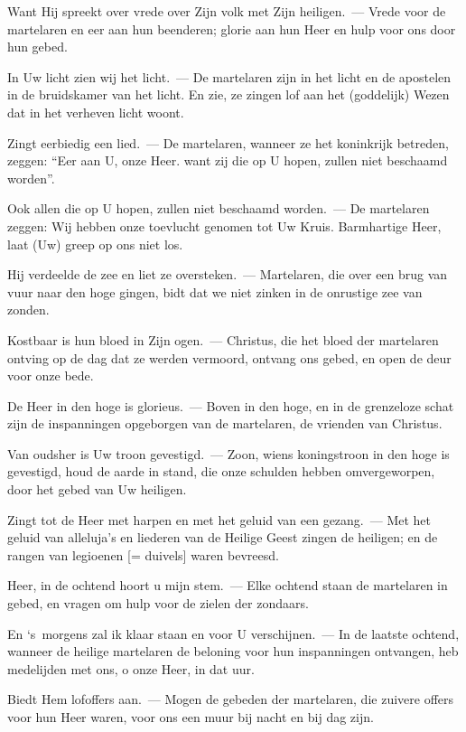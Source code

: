 \documentclass[12pt,twoside,a5paper]{article}
\begin{document}
\begin{halfparskip}
   Want Hij spreekt over vrede over Zijn volk met Zijn heiligen.~--- Vrede voor de martelaren en eer aan hun beenderen; glorie aan hun Heer en hulp voor ons door hun gebed.

  In Uw licht zien wij het licht.~--- De martelaren zijn in het licht en de apostelen in de bruidskamer van het licht. En zie, ze zingen lof aan het (goddelijk) Wezen dat in het verheven licht woont.

  Zingt eerbiedig een lied.~--- De martelaren, wanneer ze het koninkrijk betreden, zeggen: ``Eer aan U, onze Heer. want zij die op U hopen, zullen niet beschaamd worden''.

  Ook allen die op U hopen, zullen niet beschaamd worden.~--- De martelaren zeggen: Wij hebben onze toevlucht genomen tot Uw Kruis. Barmhartige Heer, laat (Uw) greep op ons niet los.

  Hij verdeelde de zee en liet ze oversteken.~--- Martelaren, die over een brug van vuur naar den hoge gingen, bidt dat we niet zinken in de onrustige zee van zonden.

  Kostbaar is hun bloed in Zijn ogen.~--- Christus, die het bloed der martelaren ontving op de dag dat ze werden vermoord, ontvang ons gebed, en open de deur voor onze bede.

  De Heer in den hoge is glorieus.~--- Boven in den hoge, en in de grenzeloze schat zijn de inspanningen opgeborgen van de martelaren, de vrienden van Christus.

  Van oudsher is Uw troon gevestigd.~--- Zoon, wiens koningstroon in den hoge is gevestigd, houd de aarde in stand, die onze schulden hebben omvergeworpen, door het gebed van Uw heiligen.

  Zingt tot de Heer met harpen en met het geluid van een gezang.~--- Met het geluid van alleluja's en liederen van de Heilige Geest zingen de heiligen; en de rangen van legioenen [= duivels] waren bevreesd.

  Heer, in de ochtend hoort u mijn stem.~--- Elke ochtend staan de martelaren in gebed, en vragen om hulp voor de zielen der zondaars.

  En `s~morgens zal ik klaar staan en voor U verschijnen.~--- In de laatste ochtend, wanneer de heilige martelaren de beloning voor hun inspanningen ontvangen, heb medelijden met ons, o onze Heer, in dat uur.

  Biedt Hem lofoffers aan.~--- Mogen de gebeden der martelaren, die zuivere offers voor hun Heer waren, voor ons een muur bij nacht en bij dag zijn.


\end{halfparskip}
\end{document}
